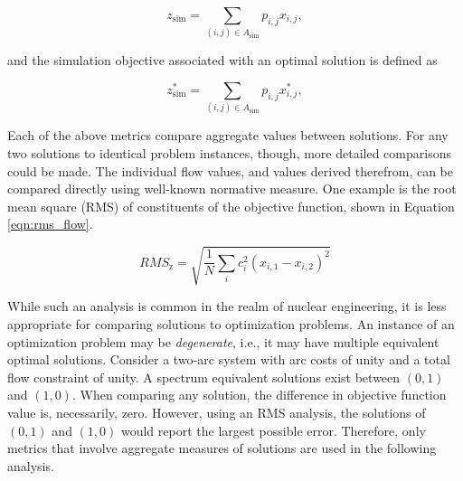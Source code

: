 \begin{equation}\label{eqn:sim_flow}
z_{\text{sim}} = \sum_{(i, j) \in A_{\text{sim}}} p_{i, j} x_{i, j},
\end{equation}

\noindent 
and the simulation objective associated with an optimal solution is defined as

\begin{equation}\label{eqn:sim_flow}
z^*_{\text{sim}} = \sum_{(i, j) \in A_{\text{sim}}} p_{i, j} x^*_{i, j},
\end{equation}



Each of the above metrics compare aggregate values between solutions. For any
two solutions to identical problem instances, though, more detailed comparisons
could be made. The individual flow values, and values derived therefrom, can be
compared directly using well-known normative measure. One example is the root
mean square (RMS) of constituents of the objective function, shown in Equation
\ref{eqn:rms_flow}.

\begin{equation}\label{eqn:rms_flow}
RMS_{\text{z}} = \sqrt{ \frac{1}{N} \sum_i c_i^2 (x_{i, 1} - x_{i, 2}) ^2 }
\end{equation}

While such an analysis is common in the realm of nuclear engineering, it is less
appropriate for comparing solutions to optimization problems. An instance of an
optimization problem may be \textit{degenerate}, i.e., it may have multiple
equivalent optimal solutions. Consider a two-arc system with arc costs of unity
and a total flow constraint of unity. A spectrum equivalent solutions exist
between $(0, 1)$ and $(1, 0)$. When comparing any solution, the difference in
objective function value is, necessarily, zero. However, using an RMS analysis,
the solutions of $(0, 1)$ and $(1, 0)$ would report the largest possible
error. Therefore, only metrics that involve aggregate measures of solutions are
used in the following analysis.

